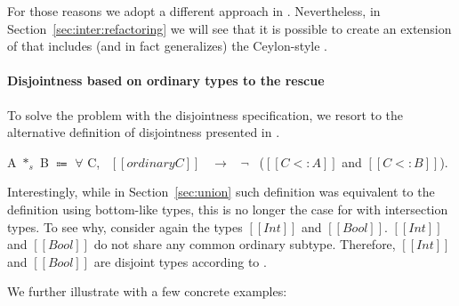 For those reasons we adopt a different approach in \name.
Nevertheless, in Section~\ref{sec:inter:refactoring} we will see that it is possible to
create an extension of \name that includes (and in fact generalizes)
the Ceylon-style .

\paragraph{Disjointness based on ordinary types to the rescue}
To solve the problem with the disjointness specification, we resort to
the alternative definition of disjointness presented in .

\begin{definition}
\label{def:inter:disj}
  A $*_s$ B $\Coloneqq$ $\forall$ C, \ $[[ordinary C]]$ \ $\rightarrow$ \ $\neg$ \ ($[[C <: A]]$ and $[[C <: B]]$).
\end{definition}

Interestingly, while in Section~\ref{sec:union} such definition was
equivalent to the definition using bottom-like types, this is no
longer the case for \name with intersection types. To see why,
consider again the types $[[Int]]$ and $[[Bool]]$.  $[[Int]]$ and
$[[Bool]]$ do not share any common ordinary subtype. Therefore,
$[[Int]]$ and $[[Bool]]$ are disjoint types according to
.
\begin{comment}
We extend our previous example of type $[[Int]]$ and type $[[Bool]]$ and show how
disjointness based upon ordinary types categorize them as disjoint types.
An important observation at this point is common subtypes of type $[[Int]]$ and type $[[Bool]]$
cannot include either $[[Int]]$ or $[[Bool]]$. Problematic types are the intersection types
such as $[[Int /\ Bool]]$. We empahsize the point that ordinary types in \cal does not contain
intersection types. Further, all ordinary types are non-overlapping in \cal.
Therefore, now we say that
two types are disjoint if they do not have any common ordinary subtype. $[[Int]]$ and $[[Bool]]$
do not share any common ordinary subtype. Therefore, $[[Int]]$ and $[[Bool]]$ are disjoint types.
\Cref{def:inter:disj} shows the declarative disjointness for \cal with intersection types:


\noindent Two types $[[A]]$ and $[[B]]$ are
disjoint if the two types $[[A /\ B]]$ do
not have any common ordinary subtype. For example, $[[Int]]$ and $[[A -> B]]$
are disjoint types because there is no ordinary type that is a subtype
of both types ($[[Int]]$ and $[[A -> B]]$).
\Cref{def:inter:disj} is the same as 
\Cref{def:union:disj1}. However, while the \Cref{def:union:disj1} in \Cref{sec:union:discussion}
is equivalent the definition of disjointness using bottom-like types (\Cref{def:union:disj}),
in the calculus with intersection types that is no longer the case.
\end{comment}
We further illustrate  
 with a few concrete examples:

